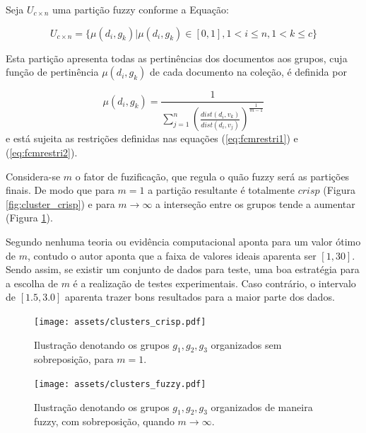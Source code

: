 Seja $U_{c \times n}$ uma partição fuzzy conforme a Equação:

\begin{equation} 
  U_{c \times n} = \{\mu(d_i, g_k) |\mu(d_i, g_k) \in [0,1], 1 < i \leq n, 1 < k \leq c\} 
  \label{eq:part_fuzzy} 
\end{equation} 

Esta partição apresenta todas as pertinências dos documentos aos grupos, cuja função de 
pertinência $\mu(d_i,g_k)$ de cada documento na coleção, é definida por 

\begin{equation} 
  \mu(d_i,g_k) = \frac{1}{\sum_{j=1}^n(\frac{dist(d_i,v_k)}{dist(d_i,v_j)})^{\frac{1}{m-1}}} 
  \label{eq:pertinencia}
\end{equation}
e está sujeita as restrições definidas nas equações (\ref{eq:fcmrestri1}) e (\ref{eq:fcmrestri2}).

Considera-se $m$ o fator de fuzificação, que regula o quão fuzzy será as partições finais. De modo
que para $m = 1$ a partição resultante é totalmente $crisp$ (Figura \ref{fig:cluster_crisp}) e para
$m \rightarrow \infty$ a interseção entre os grupos tende a aumentar (Figura
\ref{fig:cluster_fuzzy})\cite{Pal2005}. 

Segundo  nenhuma teoria ou evidência computacional aponta para um valor ótimo
de $m$, contudo o autor aponta que a faixa de valores ideais aparenta ser $[1,30]$. Sendo assim, se
existir um conjunto de dados para teste, uma boa estratégia para a escolha de $m$ é a realização de
testes experimentais. Caso contrário, o intervalo de $[1.5, 3.0]$ aparenta trazer bons resultados
para a maior parte dos dados.

\begin{figure}[!htp] \centering 
   \begin{minipage}{0.45\textwidth} 
     \centering
    \texttt{[image: assets/clusters\_crisp.pdf]} 
    \caption{Ilustração denotando os
grupos $g_1,g_2,g_3$ organizados sem sobreposição, para $m = 1$.} 
  \label{fig:cluster_crisp}
  \end{minipage}\hfill 

  \begin{minipage}{0.45\textwidth} \centering
    \texttt{[image: assets/clusters\_fuzzy.pdf]} 
    \caption{Ilustração denotando os
     grupos $g_1,g_2,g_3$ organizados de maneira fuzzy, com sobreposição, quando 
     $m \rightarrow \infty$.}
     \label{fig:cluster_fuzzy} 
   \end{minipage} 
\end{figure}

